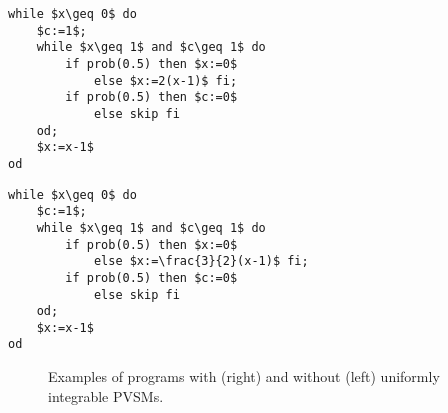 \lstset{language=affprob}
\lstset{tabsize=2}
\newsavebox{\uniinto}
\begin{lrbox}{\uniinto}
\begin{lstlisting}[mathescape]
while $x\geq 0$ do
	$c:=1$;
	while $x\geq 1$ and $c\geq 1$ do
		if prob(0.5) then $x:=0$
			else $x:=2(x-1)$ fi;
		if prob(0.5) then $c:=0$ 
			else skip fi
	od;
	$x:=x-1$
od
\end{lstlisting}
\end{lrbox}
\newsavebox{\uniintt}
\begin{lrbox}{\uniintt}
	\begin{lstlisting}[mathescape]
while $x\geq 0$ do
	$c:=1$;
	while $x\geq 1$ and $c\geq 1$ do
		if prob(0.5) then $x:=0$
			else $x:=\frac{3}{2}(x-1)$ fi;
		if prob(0.5) then $c:=0$ 
			else skip fi
	od;
	$x:=x-1$
od
	\end{lstlisting}
\end{lrbox}
\begin{figure}[t]
	\usebox{\uniinto}
	\hspace{1cm}
	\usebox{\uniintt}
\caption{Examples of programs with (right) and without (left) uniformly 
integrable PVSMs.}
\label{fig:uniint}
\end{figure}

